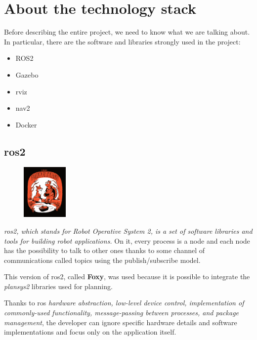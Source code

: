 \setlength\intextsep{0pt}

\chapter{About the technology stack}
\label{cha:techstack}

Before describing the entire project, we need to know what we are talking about. In particular, there are the software and libraries strongly used in the project:  
\begin{itemize}
    \item ROS2
    \item Gazebo
    \item \acrfull{rviz}
    \item \acrfull{nav2}
    \item Docker
\end{itemize}

\section{\acrshort{ros}2}

\begin{figure}
    \includegraphics[width=0.2\textwidth]{images/foxy}
\end{figure}

\textit{\acrshort{ros}2, which stands for Robot Operative System 2, is a set of software libraries and tools for building robot applications.}\cite{ros2desc} On it, every process is a node and each node has the possibility to talk to other ones thanks to some channel of communications called topics using the publish/subscribe model.

This version of \acrshort{ros}2, called \textbf{Foxy}, was used because it is possible to integrate the \textit{plansys2} libraries used for planning.

Thanks to \Acrshort{ros} \textit{hardware abstraction, low-level device control, implementation of commonly-used functionality, message-passing between processes, and package management}\cite{ros2help}, the developer can ignore specific hardware details and software implementations and focus only on the application itself. 

